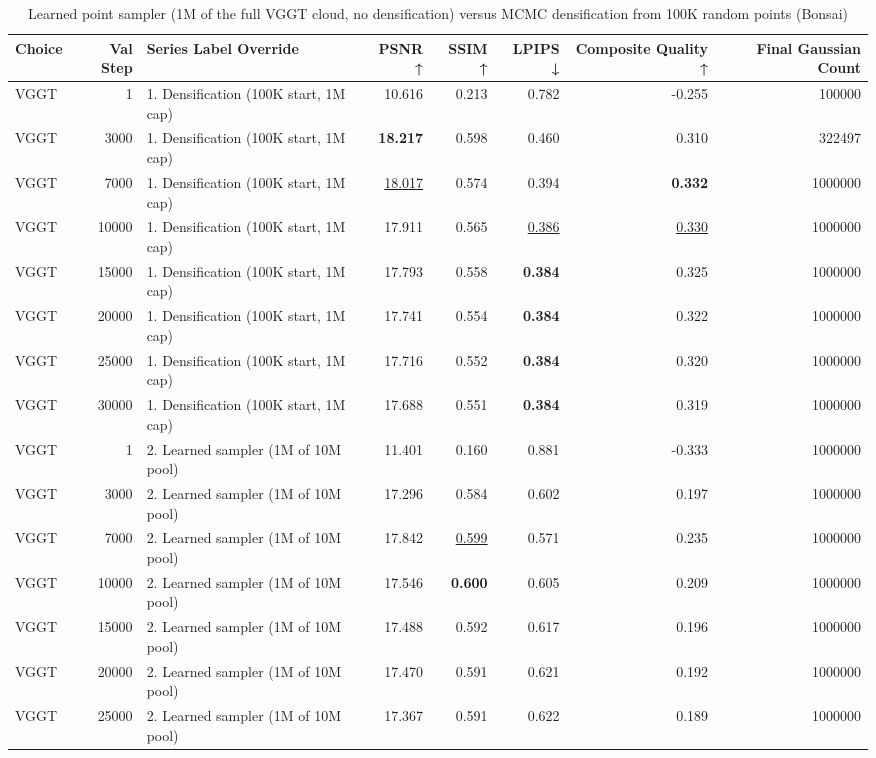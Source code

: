 \begin{table}[H]
\caption{\ifdefined\customcaption \customcaption \else Learned point sampler (1M of the full VGGT cloud, no densification) versus MCMC densification from 100K random points (Bonsai) \fi}
\label{tab:99_sampler_vs_densification_bonsai}
\centering
\scriptsize
\begin{tabular}{lrlrrrrr}
\toprule
Choice & Val Step & Series Label Override & PSNR ↑ & SSIM ↑ & LPIPS ↓ & Composite Quality ↑ & Final Gaussian Count \\
\midrule
VGGT & 1 & 1. Densification (100K start, 1M cap) & 10.616 & 0.213 & 0.782 & -0.255 & 100000 \\
VGGT & 3000 & 1. Densification (100K start, 1M cap) & \textbf{18.217} & 0.598 & 0.460 & 0.310 & 322497 \\
VGGT & 7000 & 1. Densification (100K start, 1M cap) & \underline{18.017} & 0.574 & 0.394 & \textbf{0.332} & 1000000 \\
VGGT & 10000 & 1. Densification (100K start, 1M cap) & 17.911 & 0.565 & \underline{0.386} & \underline{0.330} & 1000000 \\
VGGT & 15000 & 1. Densification (100K start, 1M cap) & 17.793 & 0.558 & \textbf{0.384} & 0.325 & 1000000 \\
VGGT & 20000 & 1. Densification (100K start, 1M cap) & 17.741 & 0.554 & \textbf{0.384} & 0.322 & 1000000 \\
VGGT & 25000 & 1. Densification (100K start, 1M cap) & 17.716 & 0.552 & \textbf{0.384} & 0.320 & 1000000 \\
VGGT & 30000 & 1. Densification (100K start, 1M cap) & 17.688 & 0.551 & \textbf{0.384} & 0.319 & 1000000 \\
VGGT & 1 & 2. Learned sampler (1M of 10M pool) & 11.401 & 0.160 & 0.881 & -0.333 & 1000000 \\
VGGT & 3000 & 2. Learned sampler (1M of 10M pool) & 17.296 & 0.584 & 0.602 & 0.197 & 1000000 \\
VGGT & 7000 & 2. Learned sampler (1M of 10M pool) & 17.842 & \underline{0.599} & 0.571 & 0.235 & 1000000 \\
VGGT & 10000 & 2. Learned sampler (1M of 10M pool) & 17.546 & \textbf{0.600} & 0.605 & 0.209 & 1000000 \\
VGGT & 15000 & 2. Learned sampler (1M of 10M pool) & 17.488 & 0.592 & 0.617 & 0.196 & 1000000 \\
VGGT & 20000 & 2. Learned sampler (1M of 10M pool) & 17.470 & 0.591 & 0.621 & 0.192 & 1000000 \\
VGGT & 25000 & 2. Learned sampler (1M of 10M pool) & 17.367 & 0.591 & 0.622 & 0.189 & 1000000 \\

\end{tabular}
\end{table}
